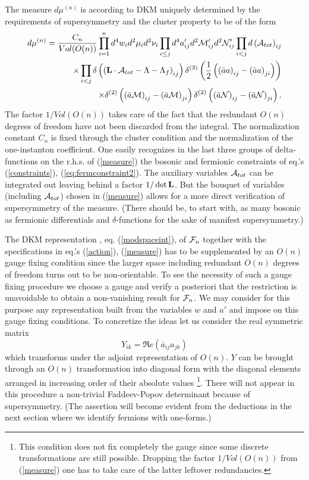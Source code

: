 \documentclass[a4paper,12pt]{article}
\begin{document}
The measure $d\mu^{(n)}$ is according to DKM \cite{dorey3} uniquely determined 
by the requirements of supersymmetry and the cluster property 
to be of the form  
\begin{eqnarray} 
d\mu^{(n)} =\frac{C_n}{Vol(O(n))} \prod_{i=1}^n d^4 w_i 
d^2 \mu_i d^2 \nu_i \prod_{i\le j}d^4 a'_{ij} 
d^2 {\cal M}'_{ij} d^2 {\cal N}'_{ij} 
\prod_{i<j}d\left({\cal A}_{tot}\right)_{ij} \nonumber \\ 
\times \prod_{i<j}
\delta \left(\left({\bf L} \cdot {\cal A}_{tot}
-\Lambda -\Lambda_f\right)_{ij}\right)
\delta^{(3)}\left(\frac{1}{2}\left(
\left(\bar{a}a\right)_{ij}-\left(\bar{a}a\right)_{ji}
\right)\right) \nonumber \\ 
\times \delta^{(2)}\left(\left(\bar{a}{\cal M}\right)_{ij}-
\left(\bar{a}{\cal M}\right)_{ji}\right) 
\delta^{(2)}\left(\left(\bar{a}{\cal N}\right)_{ij}-
\left(\bar{a}{\cal N}\right)_{ji}\right).
\label{measure}  
\end{eqnarray} 
The factor $1/Vol(O(n))$ takes care of the fact that the 
redundant $O(n)$ degrees of freedom have not been discarded 
from the integral. The normalization constant $C_n$ is fixed 
through the cluster condition and the normalization of the 
one-instanton coefficient. One easily recognizes in the 
last three groups of delta-functions on the r.h.s. 
of (\ref{measure}) the bosonic and fermionic constraints 
of eq.'s (\ref{constraints}), (\ref{eq:fermconstraint2}). 
The auxiliary variables ${\cal A}_{tot}$ can be integrated 
out leaving behind a factor $1/\det {\bf L}$. But the bouquet 
of variables (including ${\cal A}_{tot}$) chosen in (\ref{measure}) 
allows for a more direct verification of supersymmetry of the 
measure. (There should be, to start with, as many bosonic 
as fermionic differentials and $\delta$-functions for the sake 
of manifest supersymmetry.)

The DKM representation , eq. (\ref{modspaceint}), of ${\cal F}_n$ 
together with the specifications in eq.'s (\ref{action}), 
(\ref{measure}) has to be supplemented by an $O(n)$ gauge fixing  
condition since the larger 
space including redundant $O(n)$ degrees of freedom turns out to 
be non-orientable. To see the necessity of such a gauge fixing 
procedure we choose a gauge and verify a posteriori that the 
restriction is unavoidable to obtain a non-vanishing result 
for ${\cal F}_n$. We may consider for this purpose any representation 
built from the variables $w$ and $a'$ and impose on this gauge 
fixing conditions. To concretize the ideas let us consider the real 
symmetric matrix 
\[
Y_{ik}=\Re e \left(\bar{a}_{ij}a_{jk}\right)
\]
which transforms under the adjoint representation of $O(n)$. $Y$ 
can be brought through an $O(n)$ transformation into diagonal 
form with the diagonal elements arranged in increasing order of 
their absolute values \footnote{
This condition does not fix completely the gauge since some 
discrete transformations are still possible. Dropping
the factor $1/Vol(O(n))$ from (\ref{measure}) one has to take 
care of the latter leftover redundancies.}. There will not appear 
in this procedure a 
non-trivial Faddeev-Popov determinant because of supersymmetry. 
(The assertion will become evident from the deductions in the 
next section where we identify fermions with one-forms.)
\end{document}
